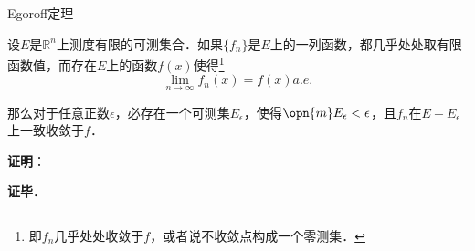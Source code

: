 \begin{theorem}{Egoroff定理}

设$E$是$\mathbb{R}^n$上测度有限的可测集合．如果$\{f_n\}$是$E$上的一列函数，都几乎处处取有限函数值，而存在$E$上的函数$f(x)$使得\footnote{即$f_n$几乎处处收敛于$f$，或者说不收敛点构成一个零测集．}\begin{equation}
\lim\limits_{n\to\infty}f_n(x)=f(x)a. e. 
\end{equation}

那么对于任意正数$\epsilon$，必存在一个可测集$E_\epsilon$，使得$\opn{m}E_\epsilon<\epsilon$，且$f_n$在$E-E_\epsilon$上一致收敛于$f$．

\end{theorem}

\textbf{证明}：



\textbf{证毕}．










